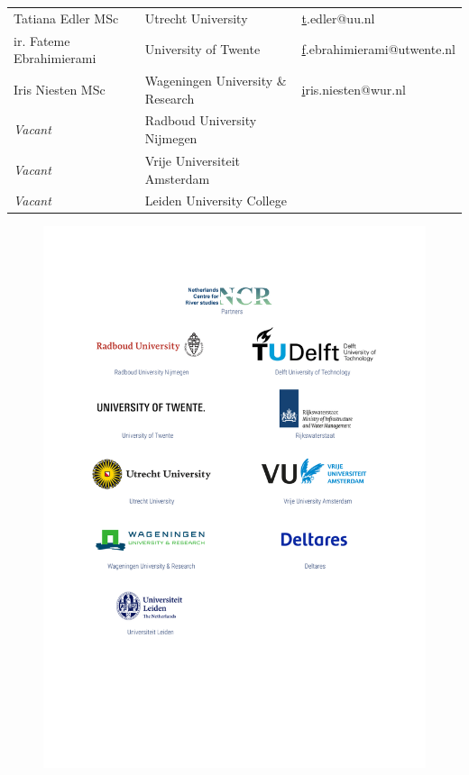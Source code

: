 \begin{longtable}{@{}lll@{}}
\rowcolor[HTML]{B9C6D5} 
Tatiana Edler MSc                      & Utrecht University                                    & {\color[HTML]{0563C1} {\ul t.edler@uu.nl}}                   \\
\rowcolor[HTML]{C9D6D6} 
ir. Fateme Ebrahimierami               & University of Twente                                  & {\color[HTML]{0563C1} {\ul f.ebrahimierami@utwente.nl}}      \\
\rowcolor[HTML]{B9C6D5} 
Iris Niesten MSc                       & Wageningen University   \& Research                   & {\color[HTML]{0563C1} {\ul iris.niesten@wur.nl}}             \\
\rowcolor[HTML]{C9D6D6} 
\textit{Vacant}                        & Radboud University   Nijmegen                         & {\color[HTML]{0563C1} {\ul }}                                \\
\rowcolor[HTML]{B9C6D5} 
\textit{Vacant}                        & Vrije Universiteit   Amsterdam                        & {\color[HTML]{0563C1} {\ul }}                                \\
\rowcolor[HTML]{C9D6D6} 
\textit{Vacant}                        & Leiden University   College                           & {\color[HTML]{0563C1} {\ul }}                                                   

\end{longtable}

\begin{figure}
\centering
\includegraphics[width=\textwidth]{figures/ncr_partners.png}
\end{figure}{}